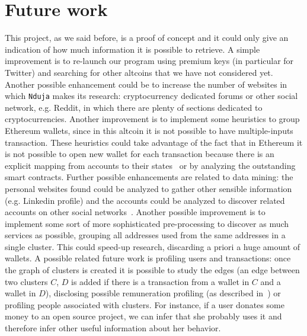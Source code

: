 \section{Future work}
\label{future}
This project, as we said before, is a proof of concept and it could only give
an indication of how much information it is possible to retrieve. A simple
improvement
is to re-launch our program using premium keys (in particular for Twitter) and
searching for other altcoins that we have not considered yet. Another possible
enhancement could be to increase the number of websites in which \texttt{Nduja}
makes its research: cryptocurrency dedicated forums or other social network,
e.g. Reddit, in which there are plenty of sections dedicated to 
cryptocurrencies.
Another
improvement is to implement some heuristics to group Ethereum wallets, since in
this altcoin it is not possible to have multiple-inputs transaction. These
heuristics could take advantage of the fact that in Ethereum it is
not possible to open new wallet for each transaction because there is an
explicit mapping from accounts to their states~\cite{bib:ethersok} or 
by analyzing the outstanding smart contracts.
Further possible enhancements are related to data mining: 
the personal websites found could be analyzed to gather other sensible
information (e.g. Linkedin profile) and the accounts could be analyzed to
discover related accounts on other social networks~\cite{bib:osinference}.
Another possible improvement is to implement some sort of more sophisticated
pre-processing to discover as much services as possible, grouping all addresses
used from the same addresses in a single cluster. This could speed-up research,
discarding a priori a huge amount of wallets. A possible related future work is
profiling users and transactions: once the graph of clusters is created it is
possible to study the edges (an edge between two clusters $C$, $D$ is added
if there is a transaction from a wallet in $C$ and a wallet in $D$), disclosing
possible remuneration profiling (as described in~\cite{bib:fullDiscl}) or
profiling people associated with clusters.
For instance, if a user donates some money to an open source project,
we can infer that she probably uses it and therefore infer other useful
information about her behavior.

